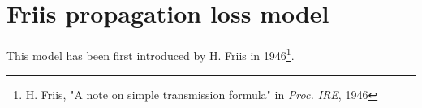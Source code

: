 \documentclass[11pt,journal]{article}
\begin{document}
	\section{Friis propagation loss model}
	This model has been first introduced by H. Friis in 1946\footnote{H. Friis, "A note on simple transmission formula" in \emph{Proc. IRE}, 1946}. 
	

	
\end{document}
